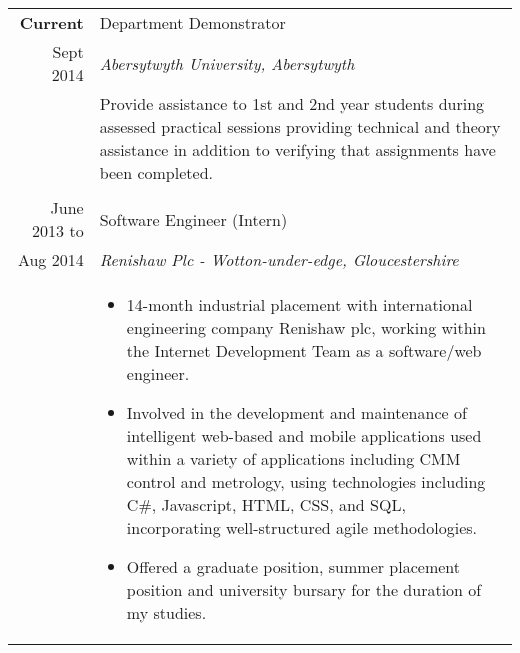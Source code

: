 \documentclass[a4paper, 10pt]{extarticle} %
\begin{document}
\begin{longtable}{r | p{13cm}}

			\textbf{Current}
		
		 & 
		 
		 Department Demonstrator  \\
		 
			Sept 2014
		& 
		
		\textit{Abersytwyth University, Abersytwyth} \\ 
		
& 

\footnotesize{Provide assistance to 1st and 2nd year students during assessed practical sessions providing technical and theory assistance in addition to verifying that assignments have been completed.} \\

\multicolumn{2}{c}{} \\

			June 2013 to
		
		 & 
		 
		 Software Engineer (Intern)  \\
		 
			Aug 2014
		 
		& 
		 
		\textit{Renishaw Plc - Wotton-under-edge, Gloucestershire} \\ 
		
& 

\footnotesize{

\vspace{-0.3cm}

\begin{itemize}[leftmargin=*]
\item 14-month industrial placement with international engineering company Renishaw plc, working within the Internet Development Team as a software/web engineer. 

\item Involved in the development and maintenance of intelligent web-based and mobile applications used within a variety of applications including CMM control and metrology, using technologies including C\#, Javascript, HTML, CSS, and SQL, incorporating well-structured agile methodologies.

\item Offered a graduate position, summer placement position and university bursary for the duration of my studies.

\vspace{-0.3cm}


\end{itemize}}
\end{longtable}
\end{document}
